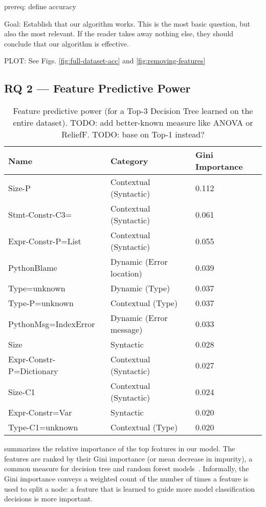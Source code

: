 \documentclass[conference]{IEEEtran}
\begin{document}
prereq: define accuracy

Goal: Establish that our algorithm works. This is the most basic question,
but also the most relevant. If the reader takes away nothing else, they
should conclude that our algorithm is effective.

PLOT: See Figs. \ref{fig:full-dataset-acc} and \ref{fig:removing-features}

\subsection{RQ 2 --- Feature Predictive Power}

\begin{table}[]
\begin{tabular}{lll}
Name & Category & Gini Importance \\ \bottomrule
Size-P & Contextual (Syntactic)               & 0.112 \\
Stmt-Constr-C3= & Contextual (Syntactic)      & 0.061 \\
Expr-Constr-P=List & Contextual (Syntactic)   & 0.055 \\
PythonBlame & Dynamic (Error location)        & 0.039 \\
Type=unknown & Dynamic (Type)                 & 0.037 \\
Type-P=unknown & Contextual (Type)            & 0.037 \\
PythonMsg=IndexError & Dynamic (Error message)& 0.033 \\
Size & Syntactic                              & 0.028 \\
Expr-Constr-P=Dictionary & Contextual (Syntactic) & 0.027 \\
Size-C1 & Contextual (Syntactic)              & 0.024 \\
Expr-Constr=Var & Syntactic                   & 0.020 \\
Type-C1=unknown & Contextual (Type)           & 0.020 \\
\toprule
\end{tabular}
\caption{Feature predictive power (for a Top-3 Decision Tree 
learned on the entire dataset). 
TODO: add
better-known measure like ANOVA or ReliefF. TODO: base on Top-1 instead?}
\label{tab-feature-predictive-power}
\end{table}

 summarizes the relative importance 
of the top features in our model. The features are ranked by their
Gini importance (or mean decrease in impurity), a common measure
for decision tree and random forest models~\cite{FIXME}. Informally, the
Gini importance conveys a weighted count of the number of times a feature
is used to split a node: a feature that is learned to guide more model
classification decisions is more important. 
\end{document}
